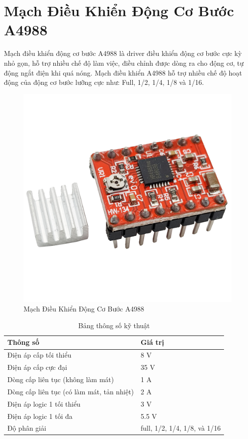 \documentclass[12pt]{report}
\begin{document}
\section{Mạch Điều Khiển Động Cơ Bước A4988}
Mạch điều khiển động cơ bước A4988 là driver điều khiển động cơ bước cực kỳ nhỏ gọn, hỗ trợ nhiều chế độ làm việc, điều chỉnh được dòng ra cho động cơ, tự động ngắt điện khi quá nóng. Mạch điều khiển A4988 hỗ trợ nhiều chế độ hoạt động của động cơ bước lưỡng cực như: Full, 1/2, 1/4, 1/8 và 1/16.

    
    \begin{figure}[H]
        \centering
        \includegraphics[width=0.5\linewidth]{image/driver.jpg}
        \caption{Mạch Điều Khiển Động Cơ Bước A4988}
    \end{figure}

\begin{table}[H]
    \centering
    \begin{tabular}{ll}
        \toprule %
        Thông số & Giá trị \\
        \midrule %
        Điện áp cấp tối thiểu & 8 V \\
        Điện áp cấp cực đại & 35 V \\
        Dòng cấp liên tục (không làm mát) & 1 A \\
        Dòng cấp liên tục (có làm mát, tản nhiệt) & 2 A \\
        Điện áp logic 1 tối thiểu & 3 V \\
        Điện áp logic 1 tối đa & 5.5 V \\
        Độ phân giải & full, 1/2, 1/4, 1/8, và 1/16 \\
        \bottomrule %
    \end{tabular}
    \caption{Bảng thông số kỹ thuật} %
\end{table}
\end{document}
